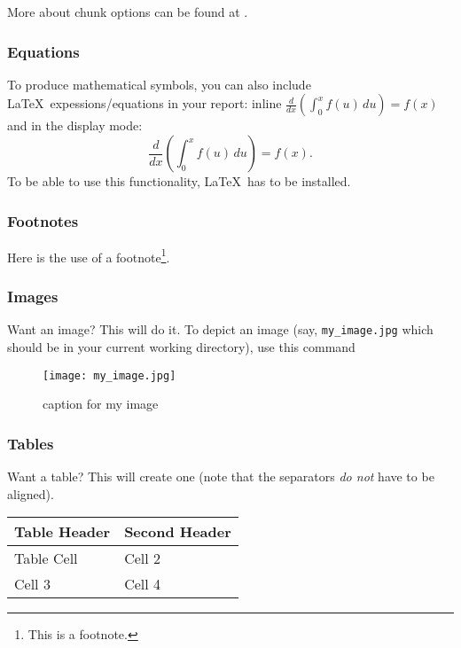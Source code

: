 \documentclass[
  11pt,
]{article}
\begin{document}
More about chunk options can be found at
\href{https://yihui.name/knitr/options/}{}.

\hypertarget{equations}{%
\subsubsection{Equations}\label{equations}}

To produce mathematical symbols, you can also include
\LaTeX~expessions/equations in your report: inline
\(\frac{d}{dx}\left(\int_{0}^{x} f(u)\,du\right)=f(x)\) and in the
display mode: \[
\frac{d}{dx}\left( \int_{0}^{x} f(u)\,du\right)=f(x).
\] To be able to use this functionality, \LaTeX~has to be installed.

\hypertarget{footnotes}{%
\subsubsection{Footnotes}\label{footnotes}}

Here is the use of a footnote\footnote{This is a footnote.}.

\hypertarget{images}{%
\subsubsection{Images}\label{images}}

Want an image? This will do it. To depict an image (say,
\texttt{my\_image.jpg} which should be in your current working
directory), use this command

\begin{figure}
\centering
\texttt{[image: my\_image.jpg]}
\caption{caption for my image}
\end{figure}

\hypertarget{tables}{%
\subsubsection{Tables}\label{tables}}

Want a table? This will create one (note that the separators \emph{do
not} have to be aligned).

\begin{longtable}[]{@{}ll@{}}
\toprule()
Table Header & Second Header \\
\midrule()
\endhead
Table Cell & Cell 2 \\
Cell 3 & Cell 4 \\
\bottomrule()
\end{longtable}
\end{document}

